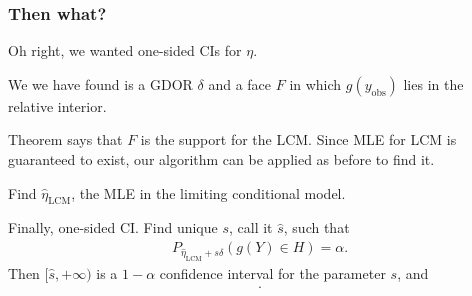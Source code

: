 \documentclass[slidestop,compress, 10pt]{beamer}
\newcommand{\etaLCM}{\hat{\eta}_{\textrm{LCM}}}
\newcommand{\yobs}{y_{\text{obs}}}
\begin{document}
\frame
{
\frametitle{Then what?}  
Oh right, we wanted one-sided CIs for $\eta$.

We we have found is a GDOR $\delta$ and a face $F$ in which $g(\yobs)$ lies
in the relative interior.

Theorem says that $F$ is the support for the LCM.  Since MLE for LCM is guaranteed to exist, our algorithm can be applied as before to find it.

Find $\etaLCM$, the MLE in the limiting conditional model.

Finally, one-sided CI.
Find unique $s$, call it $\hat{s}$, such that
\begin{align*}
		P_{\etaLCM + s \delta}( g(Y) \in H) = \alpha.
\end{align*}
Then $[ \hat{s}, +\infty)$ is a $1- \alpha$ confidence interval for the parameter $s$, and
\begin{align*}
[ \etaLCM + \hat{s} \delta, + \infty)
\end{align*}

In this example where $g(\yobs) = (31,50)$, 
\begin{align*}
	\etaLCM = (126.8, -21.1)\\
	\delta = (6,-1)
\end{align*}
and a one-sided 95\% CI yields
\begin{align*}
	[9.145, +\infty) \\
	(-\infty, -1.500].
\end{align*}


}

\end{document}
